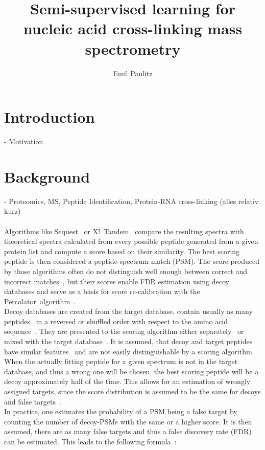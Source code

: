 \documentclass[10pt,a4paper]{article}
\author{Emil Paulitz}
\title{Semi-supervised learning for nucleic acid cross-linking mass spectrometry}
\begin{document}
	\ohead{\theauthor}
	\cfoot{\pagemark}
	\maketitle
	\tableofcontents
	
	\section{Introduction}
		- Motivation
	\section{Background}	
		- Proteomics, MS, Peptide Identification, Protein-RNA cross-linking (alles relativ kurz)\\
		\\
		Algorithms like Sequest~\cite{Eng1994} or X!~Tandem~\cite{Craig2004} compare the resulting spectra with theoretical spectra calculated from every possible peptide generated from a given protein list and compute a score based on their similarity. The best scoring peptide is then considered a peptide-spectrum-match (PSM). The score produced by those algorithms often do not distinguish well enough between correct and incorrect matches~\cite{Kll2007}, but their scores enable FDR estimation using decoy databases and serve as a basis for score re-calibration with the Percolator~algorithm~\cite{Granholm2012}.\\
		Decoy databases are created from the target database, contain usually as  many peptides~\cite{Peng2003, Moore2002} in a reversed or shuffled order with respect to the amino acid sequence~\cite{Aggarwal2016}. They are presented to the scoring algorithm either separately~\cite{Granholm2012} or mixed with the target database~\cite{Peng2003}. It is assumed, that decoy and target peptides have similar features~\cite{Moore2002} and are not easily distinguishable by a scoring algorithm. When the actually fitting peptide for a given spectrum is not in the target database, and thus a wrong one will be chosen, the best scoring peptide will be a decoy approximately half of the time. This allows for an estimation of wrongly assigned targets, since the score distribution is assumed to be the same for decoys and false targets~\cite{Aggarwal2016}.\\
		In practice, one estimates the probability of a PSM being a false target by counting the number of decoy-PSMs with the same or a higher score. It is then assumed, there are as many false targets and thus a false discovery rate (FDR) can be estimated. This leads to the following formula~\cite{Granholm2012}:
\end{document}

